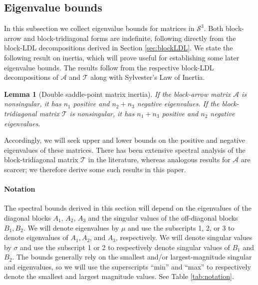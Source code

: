 \documentclass{article}
\newtheorem{lemma}{Lemma}
\newcommand{\st}{\mathcal{S}^3}
\newcommand{\sA}{\mathcal{A}}
\newcommand{\sT}{\mathcal{T}}
\begin{document}
\subsection{Eigenvalue bounds}

In this subsection we collect eigenvalue bounds for matrices in $\st$. Both block-arrow and block-tridiagonal forms are indefinite, following directly from the block-LDL decompositions derived in Section \ref{sec:blockLDL}. We state the following result on inertia, which will prove useful for establishing some later eigenvalue bounds. The results follow from the respective block-LDL decompositions of $\sA$ and $\sT$ along with Sylvester's Law of Inertia.

\begin{lemma}[Double saddle-point matrix inertia]
    If the block-arrow matrix $\sA$ is nonsingular, it has $n_1$ positive and $n_2+n_3$ negative eigenvalues. If the block-tridiagonal matrix $\sT$ is nonsingular, it has $n_1+n_3$ positive and $n_2$ negative eigenvalues.
    \label{lem:inertia}
\end{lemma}

Accordingly, we will seek upper and lower bounds on the positive and negative eigenvalues of these matrices. There has been extensive spectral analysis of the block-tridiagonal matrix $\sT$ in the literature, whereas analogous results for $\sA$ are scarcer; we therefore derive some such results in this paper. 

\paragraph{Notation} The spectral bounds derived in this section will depend on the eigenvalues of the diagonal blocks $A_1$, $A_2$, $A_3$ and the singular values of the off-diagonal blocks $B_1, B_2$. We will denote eigenvalues by $\mu$ and use the subscripts 1, 2, or 3 to denote eigenvalues of $A_1, A_2$, and $A_3$, respectively. We will denote singular values by $\sigma$ and use the subscript 1 or 2 to respectively denote singular values of $B_1$ and $B_2$. The bounds generally rely on the smallest and/or largest-magnitude singular and eigenvalues, so we will use the superscripts ``min'' and ``max'' to respectively denote the smallest and largest magnitude values. See Table \ref{tab:notation}.
\end{document}
